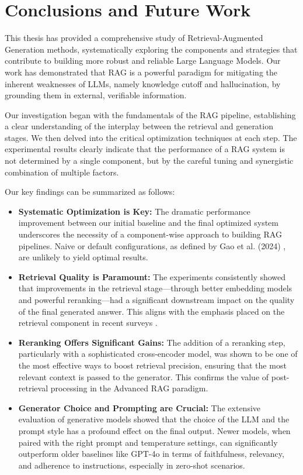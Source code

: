 \chapter{Conclusions and Future Work}
\label{chap:conclusions}

This thesis has provided a comprehensive study of Retrieval-Augmented Generation methods, systematically exploring the components and strategies that contribute to building more robust and reliable Large Language Models. Our work has demonstrated that RAG is a powerful paradigm for mitigating the inherent weaknesses of LLMs, namely knowledge cutoff and hallucination, by grounding them in external, verifiable information.

Our investigation began with the fundamentals of the RAG pipeline, establishing a clear understanding of the interplay between the retrieval and generation stages. We then delved into the critical optimization techniques at each step. The experimental results clearly indicate that the performance of a RAG system is not determined by a single component, but by the careful tuning and synergistic combination of multiple factors. 

Our key findings can be summarized as follows:
\begin{itemize}
    \item \textbf{Systematic Optimization is Key:} The dramatic performance improvement between our initial baseline and the final optimized system underscores the necessity of a component-wise approach to building RAG pipelines. Naive or default configurations, as defined by Gao et al. (2024) \autocite{gao2024retrievalaugmented}, are unlikely to yield optimal results.
    \item \textbf{Retrieval Quality is Paramount:} The experiments consistently showed that improvements in the retrieval stage—through better embedding models and powerful reranking—had a significant downstream impact on the quality of the final generated answer. This aligns with the emphasis placed on the retrieval component in recent surveys \autocite{gao2024retrievalaugmented}.
    \item \textbf{Reranking Offers Significant Gains:} The addition of a reranking step, particularly with a sophisticated cross-encoder model, was shown to be one of the most effective ways to boost retrieval precision, ensuring that the most relevant context is passed to the generator. This confirms the value of post-retrieval processing in the Advanced RAG paradigm.
    \item \textbf{Generator Choice and Prompting are Crucial:} The extensive evaluation of generative models showed that the choice of the LLM and the prompt style has a profound effect on the final output. Newer models, when paired with the right prompt and temperature settings, can significantly outperform older baselines like GPT-4o in terms of faithfulness, relevancy, and adherence to instructions, especially in zero-shot scenarios.
\end{itemize}

